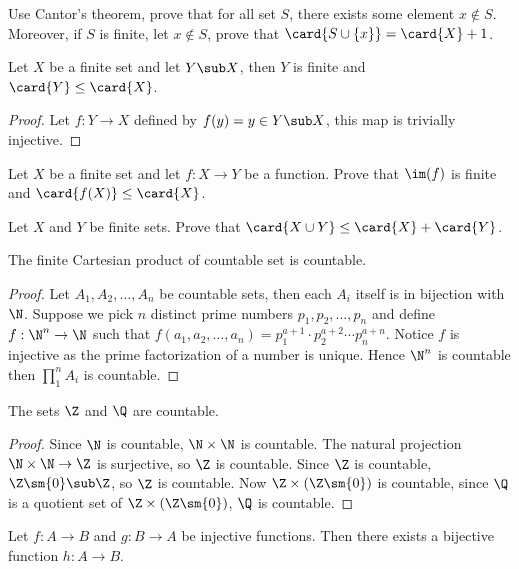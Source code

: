 \documentclass[10pt]{article}
\begin{document}
\begin{problem}
    Use Cantor's theorem, prove that for all set $S$, there exists some element $x\notin S$. Moreover, if $S$ is finite, let $x\notin S$, prove that $\card{S\cup\{x\}}=\card{X}+1$.
\end{problem}
\begin{proposition}
    Let $X$ be a finite set and let $Y\sub X$, then $Y$ is finite and $\card{Y}\le\card{X}$.
\end{proposition}
\begin{proof}
    Let $f:Y\to X$ defined by $f(y)=y\in Y\sub X$, this map is trivially injective.
\end{proof}
\begin{problem}
    Let $X$ be a finite set and let $f:X\to Y$ be a function. Prove that $\im(f)$ is finite and $\card{f(X)}\le\card{X}$.
\end{problem}
\begin{problem}
    Let $X$ and $Y$ be finite sets. Prove that $\card{X\cup Y}\le\card{X}+\card{Y}$.
\end{problem}
\begin{proposition}
    The finite Cartesian product of countable set is countable.
\end{proposition}
\begin{proof}
    Let ${A}_{1},{A}_{2},\dots,{A}_{n}$ be countable sets, then each ${A}_{i}$ itself is in bijection with $\N$. Suppose we pick $n$ distinct prime numbers ${p}_{1},{p}_{2},\dots,{p}_{n}$ and define $f:{\N}^{n}\to\N$ such that $f({a}_{1},{a}_{2},\dots,{a}_{n})={p}_{1}^{a+1}\cdot{p}_{2}^{a+2}\cdots{p}_{n}^{a+n}$. Notice $f$ is injective as the prime factorization of a number is unique. Hence ${\N}^{n}$ is countable then ${\prod}_{1}^{n}{A}_{i}$ is countable.
\end{proof}
\begin{proposition} 
    The sets $\Z$ and $\Q$ are countable.
\end{proposition}
\begin{proof}
    Since $\N$ is countable, $\N\times\N$ is countable. The natural projection $\N\times\N\to\Z$ is surjective, so $\Z$ is countable. Since $\Z$ is countable, $\Z\sm\{0\}\sub\Z$, so $\Z$ is countable. Now $\Z\times(\Z\sm\{0\})$ is countable, since $\Q$ is a quotient set of $\Z\times(\Z\sm\{0\})$, $\Q$ is countable.
\end{proof}
\begin{theorem}
    Let $f:A\to B$ and $g:B\to A$ be injective functions. Then there exists a bijective function $h:A\to B$.
\end{theorem}
\end{document}
